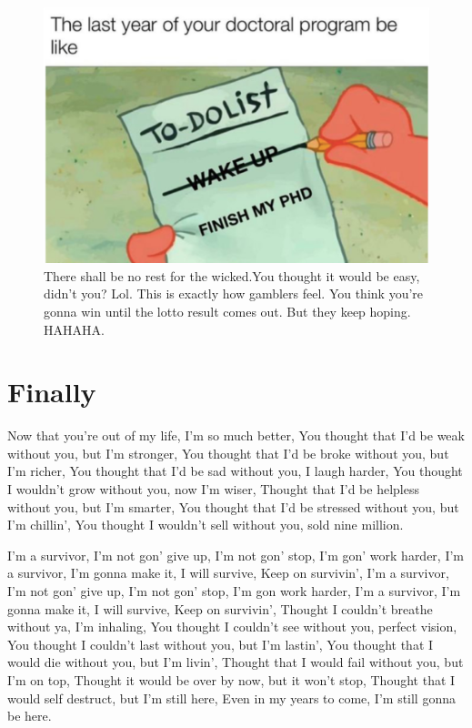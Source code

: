 \begin{figure}[!hbt]
    \centering
    \includegraphics[width=1\linewidth]{figures/chapter_1/no-sleep-for-the-wicked.jpg}
    \caption[There shall be no rest for the wicked.]{There shall be no rest for the wicked.You thought it would be easy, didn't you? Lol. This is exactly how gamblers feel. You think you're gonna win until the lotto result comes out. But they keep hoping. HAHAHA.}
    \label{fig:nosleep}
\end{figure}

\section{Finally}
Now that you're out of my life, I'm so much better, You thought that I'd be weak without you, but I'm stronger, You thought that I'd be broke without you, but I'm richer, You thought that I'd be sad without you, I laugh harder, You thought I wouldn't grow without you, now I'm wiser, Thought that I'd be helpless without you, but I'm smarter, You thought that I'd be stressed without you, but I'm chillin', You thought I wouldn't sell without you, sold nine million.

I'm a survivor, I'm not gon' give up, I'm not gon' stop, I'm gon' work harder, I'm a survivor, I'm gonna make it, I will survive, Keep on survivin', I'm a survivor, I'm not gon' give up, I'm not gon' stop, I'm gon work harder, I'm a survivor, I'm gonna make it, I will survive, Keep on survivin', Thought I couldn't breathe without ya, I'm inhaling, You thought I couldn't see without you, perfect vision, You thought I couldn't last without you, but I'm lastin', You thought that I would die without you, but I'm livin', Thought that I would fail without you, but I'm on top, Thought it would be over by now, but it won't stop, Thought that I would self destruct, but I'm still here, Even in my years to come, I'm still gonna be here.

